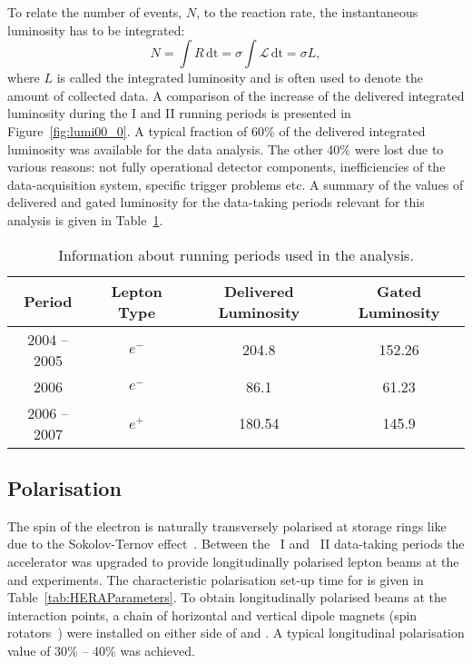 To relate the number of events, $N$, to the reaction rate, the instantaneous luminosity has to be integrated:
\begin{equation}
	N = \int{R\,\mathrm{dt}} = \sigma\int{\mathcal{L}\,\mathrm{dt}} = \sigma L,
\end{equation}
where $L$ is called the integrated luminosity and is often used to denote the amount of collected data. A comparison of the increase of the delivered integrated luminosity during the \hera I and \hera II running periods is presented in Figure~\ref{fig:lumi00_0}. A typical fraction of 60\% of the delivered integrated luminosity was available for the data analysis. The other 40\% were lost due to various reasons: not fully operational detector components, inefficiencies of the data-acquisition system, specific trigger problems etc. A summary of the values of delivered and gated luminosity for the data-taking periods relevant for this analysis is given in Table~\ref{tab:heraruns}.

\begin{table}
	\centering
		\begin{tabular}[h]{|c|c|c|c|}
		  \hline
			Period & Lepton Type & Delivered Luminosity & Gated Luminosity \\
			\hline \hline
			2004 -- 2005 & $e^{-}$  & 204.8 \invpb  & 152.26 \invpb \\
			2006         & $e^{-}$  & 86.1 \invpb  &  61.23 \invpb \\
			2006 -- 2007 & $e^{+}$  & 180.54 \invpb  & 145.9 \invpb \\
			\hline
		\end{tabular}
	\caption{Information about \hera running periods used in the analysis.}
	\label{tab:heraruns}
\end{table}

\subsection{Polarisation}
\label{subsec:polarisation}
The spin of the electron is naturally transversely polarised at storage rings like \hera due to the Sokolov-Ternov effect~\cite{Sokolov:1963zn,Baier:1969hw}. Between the \hera~I and \hera~II data-taking periods the accelerator was upgraded to provide longitudinally polarised lepton beams at the \zeus and \hone experiments. The characteristic polarisation set-up time for \hera is given in Table~\ref{tab:HERAParameters}. To obtain longitudinally polarised beams at the interaction points, a chain of horizontal and vertical dipole magnets (spin rotators~\cite{Barber:1994ew}) were installed on either side of \zeus and \hone. A typical longitudinal polarisation value of 30\% -- 40\% was achieved.

